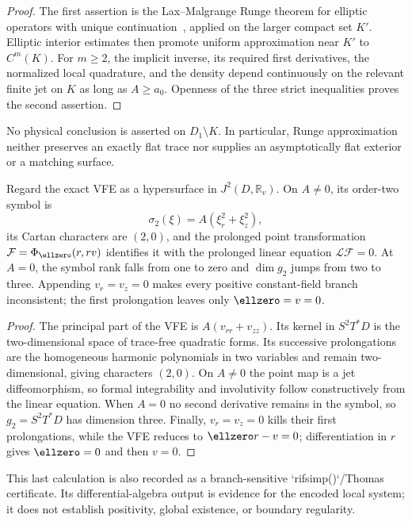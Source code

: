 \begin{proof}
The first assertion is the Lax--Malgrange Runge theorem for elliptic
operators with unique continuation~\cite{Malgrange1956AIF}, applied on the
larger compact set $K'$. Elliptic interior estimates then promote uniform
approximation near $K'$ to $C^m(K)$. For $m\geqslant2$, the implicit
inverse, its required first derivatives, the normalized local quadrature,
and the density depend continuously on the relevant finite jet on $K$ as
long as $A\geqslant a_0$. Openness of the three strict inequalities proves
the second assertion.
\end{proof}

No physical conclusion is asserted on $D_1\setminus K$. In particular,
Runge approximation neither preserves an exactly flat trace nor supplies an
asymptotically flat exterior or a matching surface.

\begin{theorem}
\label{thm:regular-sheet-involutivity}
Regard the exact VFE as a hypersurface in $J^2(D,\mathbb R_v)$. On
$A\neq0$, its order-two symbol is
$$
\sigma_2(\xi)=A(\xi_r^2+\xi_z^2),
$$
its Cartan characters are $(2,0)$, and the prolonged point transformation
$\mathcal F=\Phi_{\ellzero}(r,rv)$ identifies it with the prolonged linear
equation $\mathcal L\mathcal F=0$. At $A=0$, the symbol rank falls from one
to zero and $\dim g_2$ jumps from two to three. Appending
$v_r=v_z=0$ makes every positive constant-field branch inconsistent; the
first prolongation leaves only $\ellzero=v=0$.
\end{theorem}

\begin{proof}
The principal part of the VFE is $A(v_{rr}+v_{zz})$. Its kernel in
$S^2T^*D$ is the two-dimensional space of trace-free quadratic forms. Its
successive prolongations are the homogeneous harmonic polynomials in two
variables and remain two-dimensional, giving characters $(2,0)$. On
$A\neq0$ the point map is a jet diffeomorphism, so formal integrability and
involutivity follow constructively from the linear equation. When $A=0$ no
second derivative remains in the symbol, so $g_2=S^2T^*D$ has dimension
three. Finally, $v_r=v_z=0$ kills their first prolongations, while the VFE
reduces to $\ellzero r-v=0$; differentiation in $r$ gives $\ellzero=0$ and
then $v=0$.
\end{proof}

This last calculation is also recorded as a branch-sensitive
`rifsimp()`/Thomas certificate. Its differential-algebra output is evidence
for the encoded local system; it does not establish positivity, global
existence, or boundary regularity.
